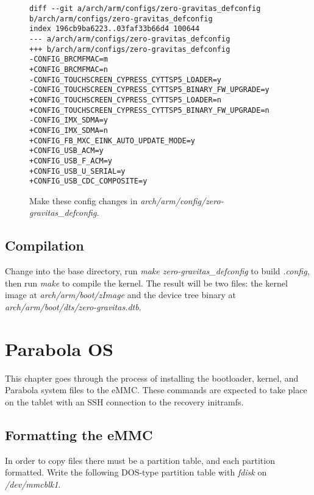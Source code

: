 \documentclass{memoir}
\begin{document}
\begin{figure}[h]
\begin{verbatim}
diff --git a/arch/arm/configs/zero-gravitas_defconfig b/arch/arm/configs/zero-gravitas_defconfig
index 196cb9ba6223..03faf33b66d4 100644
--- a/arch/arm/configs/zero-gravitas_defconfig
+++ b/arch/arm/configs/zero-gravitas_defconfig
-CONFIG_BRCMFMAC=m
+CONFIG_BRCMFMAC=n
-CONFIG_TOUCHSCREEN_CYPRESS_CYTTSP5_LOADER=y
-CONFIG_TOUCHSCREEN_CYPRESS_CYTTSP5_BINARY_FW_UPGRADE=y
+CONFIG_TOUCHSCREEN_CYPRESS_CYTTSP5_LOADER=n
+CONFIG_TOUCHSCREEN_CYPRESS_CYTTSP5_BINARY_FW_UPGRADE=n
-CONFIG_IMX_SDMA=y
+CONFIG_IMX_SDMA=n
+CONFIG_FB_MXC_EINK_AUTO_UPDATE_MODE=y
+CONFIG_USB_ACM=y
+CONFIG_USB_F_ACM=y
+CONFIG_USB_U_SERIAL=y
+CONFIG_USB_CDC_COMPOSITE=y
\end{verbatim}
\caption{Make these config changes in \textit{arch/arm/config/zero-gravitas\_defconfig}.}
\label{fig:linuxconfigdiff}
\end{figure}







\section{Compilation}
Change into the base directory, run \textit{make zero-gravitas\_defconfig} to build \textit{.config}, then run \textit{make} to compile the kernel. The result will be two files: the kernel image at \textit{arch/arm/boot/zImage} and the device tree binary at \textit{arch/arm/boot/dts/zero-gravitas.dtb}.




\chapter{Parabola OS}
This chapter goes through the process of installing the bootloader, kernel, and Parabola system files to the eMMC. These commands are expected to take place on the tablet with an SSH connection to the recovery initramfs.

\section{Formatting the eMMC}
In order to copy files there must be a partition table, and each partition formatted. Write the following DOS-type partition table with \textit{fdisk} on \textit{/dev/mmcblk1}.
\end{document}
